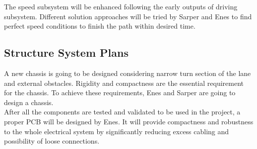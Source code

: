 \documentclass[a4paper,12pt]{article}
\begin{document}
		The speed subsystem will be enhanced following the early outputs of driving subsystem. Different solution approaches will be tried by Sarper and Enes to find perfect speed conditions to finish the path within desired time.
	
	\subsection{Structure System Plans}
	
	A new chassis is going to be designed considering narrow turn section of the lane and  external obstacles. Rigidity and compactness are  the essential requirement for the chassis. To achieve these requirements, Enes and Sarper are going to design a chassis.\\
	
	After all the components are tested and validated to be used in the project, a proper PCB will be designed by Enes. It will provide compactness and robustness to the whole electrical system by significantly reducing excess cabling and possibility of loose connections.
	
\end{document}
